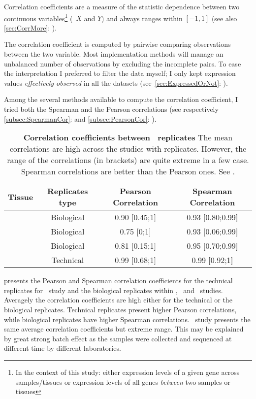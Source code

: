 Correlation coefficients are a measure of the statistic dependence between two
continuous variables\footnote{In the context of this study: either expression
levels of a given gene across samples/tissues or expression levels of all genes
\emph{between} two samples or tissues} (\eg\
$X$ and $Y$) and always ranges within $[-1,1]$ (see also
\cref{sec:CorrMore}: ).

The correlation coefficient is computed by pairwise comparing observations
between the two variable. Most implementation methods
will manage an unbalanced number of observations by excluding the incomplete pairs.
To ease the interpretation I preferred to filter the data \latin{a priori}
myself; I only kept expression values \emph{effectively observed}
in all the datasets (see~\cref{sec:ExpressedOrNot}: ).

Among the several methods available to compute the correlation coefficient,
I tried both the Spearman and the Pearson correlations
(see respectively \cref{subsec:SpearmanCor}:  and
\cref{subsec:PearsonCor}: \nameref{subsec:PearsonCor}).

\begin{table}[]
\centering
\caption[Correlation coefficients between \Rnaseq\ replicates]{%
\label{tab:repCorr}\textbf{Correlation coefficients between \Rnaseq\ replicates}
{\footnotesize The mean correlations are high across the studies with replicates.
However, the range of the correlations (in brackets) are quite extreme in a few
case. Spearman correlations are better than the Pearson ones.
See .}}
\begin{tabular}{@{}cccc@{}}
\toprule
Tissue & Replicates type & Pearson Correlation & Spearman Correlation \\ \midrule
\vt\ & Biological & 0.90 $[$0.45;1$]$ & 0.93 $[$0.80;0.99$]$ \\
\gtex\ & Biological &  0.75 $[$0;1$]$ & 0.93 $[$0.06;0.99$]$ \\
\uhlen\ & Biological & 0.81 $[$0.15;1$]$  &
0.95 $[$0.70;0.99$]$ \\
       & Technical & 0.99 $[$0.68;1$]$ & 0.99 $[$0.92;1$]$\\
\bottomrule
\end{tabular}
\end{table}

 presents the Pearson and Spearman correlation coefficients
for the technical replicates for \uhlen\ study and
the biological replicates within \vt, \gtex\ and \uhlen\ studies.
Averagely the correlation coefficients are high either for the technical or
the biological replicates.
Technical replicates present higher Pearson correlations,
while biological replicates have higher Spearman correlations.
\gtex\ study presents the same average correlation coefficients but extreme range.
This may be explained by great strong batch effect as the samples were collected
and sequenced at different time by different laboratories.

